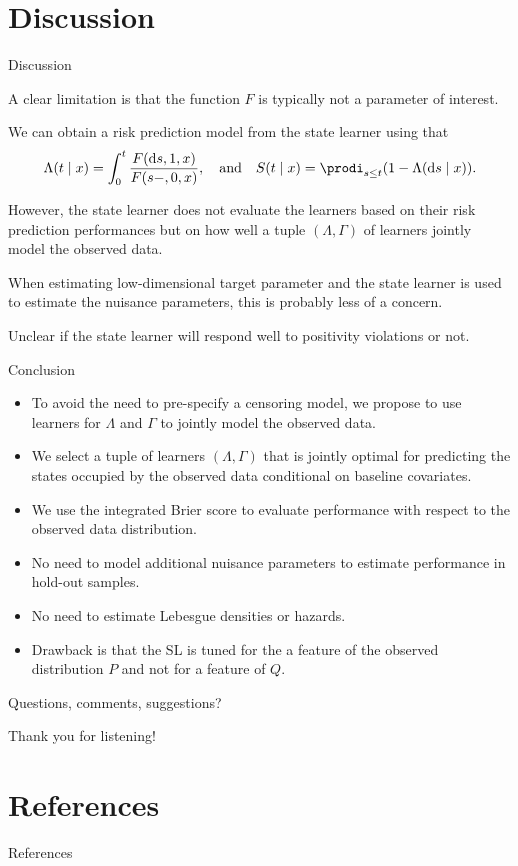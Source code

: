 \documentclass[smaller]{beamer}\usepackage{listings}
\begin{document}
\section{Discussion}
\label{sec:org8b38693}
\begin{frame}[label={sec:org92a75dd}]{Discussion}
\small

A clear limitation is that the function \(F\) is typically not a parameter of
interest.

\vfill

We can obtain a risk prediction model from the state learner using that
\begin{equation*}
  \Lambda(t \mid x) = \int_0^t \frac{F(\diff s, 1, x)}{F(s-, 0, x)} ,
  \quad \text{and} \quad
  S(t \mid x)
  = \prodi_{s \leq t}(1- \Lambda(\diff s \mid x)).
\end{equation*}

However, the state learner does not evaluate the learners based on their risk
prediction performances but on how well a tuple \((\Lambda, \Gamma)\) of
learners jointly model the observed data.

\vfill

When estimating low-dimensional target parameter and the state learner is used
to estimate the nuisance parameters, this is probably less of a concern.

\vfill

Unclear if the state learner will respond well to positivity violations or not.
\end{frame}

\begin{frame}[label={sec:org5faf490}]{Conclusion}
\small

\begin{itemize}
\item To avoid the need to pre-specify a censoring model, we propose to use learners
for \(\Lambda\) and \(\Gamma\) to jointly model the observed data.
\item We select a tuple of learners \((\Lambda, \Gamma)\) that is jointly optimal
for predicting the states occupied by the observed data conditional on
baseline covariates.
\item We use the integrated Brier score to evaluate performance with
respect to the observed data distribution.
\item No need to model additional nuisance parameters to estimate performance in
hold-out samples.
\item No need to estimate Lebesgue densities or hazards.
\item Drawback is that the SL is tuned for the a feature of the observed
distribution \(P\) and not for a feature of \(Q\).
\end{itemize}

\vfill


\begin{block}{Questions, comments, suggestions?}
\vfill

\flushright Thank you for listening!
\end{block}
\end{frame}

\section*{References}
\label{sec:orgecdcc08}
\begin{frame}[label={sec:org8c9e969}]{References}
\tiny 
\end{frame}
\end{document}
